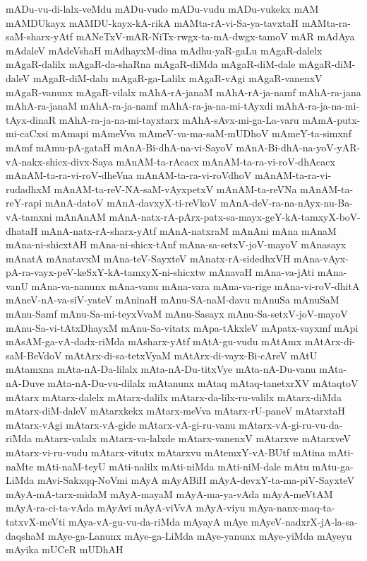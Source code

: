 {mADu-vu-di-lalx-veMdu
mADu-vudo
mADu-vudu
mADu-vukekx
mAM
mAMDUkayx
mAMDU-kayx-kA-rikA
mAMta-rA-vi-Sa-ya-tavxtaH
mAMta-ra-saM-sharx-yAtf
mANeTxV-mAR-NiTx-rwgx-ta-mA-dwgx-tamoV
mAR
mAdAya
mAdaleV
mAdeVshaH
mAdhayxM-dina
mAdhu-yaR-gaLu
mAgaR-dalelx
mAgaR-dalilx
mAgaR-da-shaRna
mAgaR-diMda
mAgaR-diM-dale
mAgaR-diM-daleV
mAgaR-diM-dalu
mAgaR-ga-Lalilx
mAgaR-vAgi
mAgaR-vanenxV
mAgaR-vanunx
mAgaR-vilalx
mAhA-rA-janaM
mAhA-rA-ja-namf
mAhA-ra-jana
mAhA-ra-janaM
mAhA-ra-ja-namf
mAhA-ra-ja-na-mi-tAyxdi
mAhA-ra-ja-na-mi-tAyx-dinaR
mAhA-ra-ja-na-mi-tayxtarx
mAhA-sAvx-mi-ga-La-varu
mAmA-putx-mi-caCxsi
mAmapi
mAmeVva
mAmeV-va-ma-saM-mUDhoV
mAmeY-ta-simxnf
mAmf
mAmu-pA-gataH
mAnA-Bi-dhA-na-vi-SayoV
mAnA-Bi-dhA-na-yoV-yAR-vA-nakx-shicx-divx-Saya
mAnAM-ta-rAcacx
mAnAM-ta-ra-vi-roV-dhAcacx
mAnAM-ta-ra-vi-roV-dheVna
mAnAM-ta-ra-vi-roVdhoV
mAnAM-ta-ra-vi-rudadhxM
mAnAM-ta-reV-NA-saM-vAyxpetxV
mAnAM-ta-reVNa
mAnAM-ta-reY-rapi
mAnA-datoV
mAnA-davxyX-ti-reVkoV
mAnA-deV-ra-na-nAyx-nu-Ba-vA-tamxni
mAnAnAM
mAnA-natx-rA-pArx-patx-sa-mayx-geY-kA-tamxyX-boV-dhataH
mAnA-natx-rA-sharx-yAtf
mAnA-natxraM
mAnAni
mAna
mAnaM
mAna-ni-shicxtAH
mAna-ni-shicx-tAnf
mAna-sa-setxV-joV-mayoV
mAnasayx
mAnatA
mAnatavxM
mAna-teV-SayxteV
mAnatx-rA-sidedhxVH
mAna-vAyx-pA-ra-vayx-peV-keSxY-kA-tamxyX-ni-shicxtw
mAnavaH
mAna-va-jAti
mAna-vanU
mAna-va-nanunx
mAna-vanu
mAna-vara
mAna-va-rige
mAna-vi-roV-dhitA
mAneV-nA-va-siV-yateV
mAninaH
mAnu-SA-naM-davu
mAnuSa
mAnuSaM
mAnu-Samf
mAnu-Sa-mi-teyxVvaM
mAnu-Sasayx
mAnu-Sa-setxV-joV-mayoV
mAnu-Sa-vi-tAtxDhayxM
mAnu-Sa-vitatx
mApa-tAkxleV
mApatx-vayxmf
mApi
mAsAM-ga-vA-dadx-riMda
mAsharx-yAtf
mAtA-gu-vudu
mAtAmx
mAtArx-di-saM-BeVdoV
mAtArx-di-sa-tetxVyaM
mAtArx-di-vayx-Bi-cAreV
mAtU
mAtamxna
mAta-nA-Da-lilalx
mAta-nA-Du-titxVye
mAta-nA-Du-vanu
mAta-nA-Duve
mAta-nA-Du-vu-dilalx
mAtanunx
mAtaq
mAtaq-tanetxrXV
mAtaqtoV
mAtarx
mAtarx-dalelx
mAtarx-dalilx
mAtarx-da-lilx-ru-valilx
mAtarx-diMda
mAtarx-diM-daleV
mAtarxkekx
mAtarx-meVva
mAtarx-rU-paneV
mAtarxtaH
mAtarx-vAgi
mAtarx-vA-gide
mAtarx-vA-gi-ru-vanu
mAtarx-vA-gi-ru-vu-da-riMda
mAtarx-valalx
mAtarx-va-lalxde
mAtarx-vanenxV
mAtarxve
mAtarxveV
mAtarx-vi-ru-vudu
mAtarx-vitutx
mAtarxvu
mAtemxY-vA-BUtf
mAtina
mAti-naMte
mAti-naM-teyU
mAti-nalilx
mAti-niMda
mAti-niM-dale
mAtu
mAtu-ga-LiMda
mAvi-Sakxqq-NoVmi
mAyA
mAyABiH
mAyA-devxY-ta-ma-piV-SayxteV
mAyA-mA-tarx-midaM
mAyA-mayaM
mAyA-ma-ya-vAda
mAyA-meVtAM
mAyA-ra-ci-ta-vAda
mAyAvi
mAyA-viVvA
mAyA-viyu
mAya-nanx-maq-ta-tatxvX-meVti
mAya-vA-gu-vu-da-riMda
mAyayA
mAye
mAyeV-nadxrX-jA-la-sa-daqshaM
mAye-ga-Lanunx
mAye-ga-LiMda
mAye-yanunx
mAye-yiMda
mAyeyu
mAyika
mUCeR
mUDhAH
}
